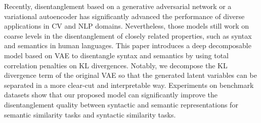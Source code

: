 Recently, disentanglement based on a generative adversarial network or a variational autoencoder has significantly advanced the performance of diverse applications in CV and NLP domains. Nevertheless, those models still work on coarse levels in the disentanglement of closely related properties, such as syntax and semantics in human languages. This paper introduces a deep decomposable model based on VAE to disentangle syntax and semantics by using total correlation penalties on KL divergences. Notably, we decompose the KL divergence term of the original VAE so that the generated latent variables can be separated in a more clear-cut and interpretable way. Experiments on benchmark datasets show that our proposed model can significantly improve the disentanglement quality between syntactic and semantic representations for semantic similarity tasks and syntactic similarity tasks.
